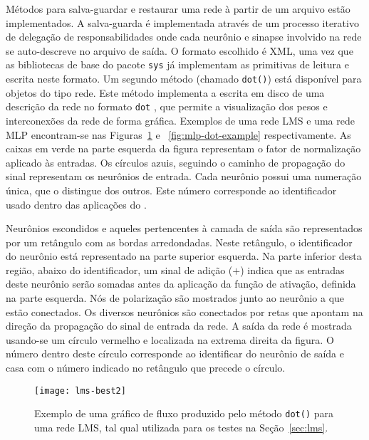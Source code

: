 Métodos para salva-guardar e restaurar uma rede à partir de um arquivo es\-tão
implementados. A salva-guarda é implementada através de um processo iterativo
de delegação de responsabilidades onde cada neurônio e sinapse involvido na
rede se auto-descreve no arquivo de saída. O formato escolhido é XML, uma vez
que as bibliotecas de base do pacote \texttt{sys} já implementam as primitivas
de leitura e escrita neste formato. Um segundo método (chamado \texttt{dot()})
está disponível para objetos do tipo rede. Este método implementa a
escrita em disco de uma descrição da rede no formato \texttt{dot}
\cite{graphviz}, que permite a visualização dos pesos e interconexões da rede
de forma gráfica. Exemplos de uma rede LMS e uma rede MLP encontram-se nas
Figuras~\ref{fig:lms-dot-example} e ~\ref{fig:mlp-dot-example}
respectivamente. As caixas em verde na parte esquerda da figura representam o
fator de normalização aplicado às entradas. Os círculos azuis, seguindo o
caminho de propagação do sinal representam os neurônios de entrada. Cada
neurônio possui uma numeração única, que o distingue dos outros. Este número
corresponde ao identificador usado dentro das aplicações do
. 

Neurônios escondidos e aqueles pertencentes à camada de saída são
representados por um retângulo com as bordas arredondadas. Neste retângulo, o
identificador do neurônio está representado na parte superior esquerda. Na
parte inferior desta região, abaixo do identificador, um sinal de adição ($+$)
indica que as entradas deste neurônio serão somadas antes da aplicação da
função de ativação, definida na parte esquerda. Nós de polarização são
mostrados junto ao neurônio a que estão conectados. Os diversos neurônios são
conectados por retas que apontam na direção da propagação do sinal de entrada
da rede. A saída da rede é mostrada usando-se um círculo vermelho e localizada
na extrema direita da figura. O número dentro deste círculo corresponde ao
identificar do neurônio de saída e casa com o número indicado no retângulo que
precede o círculo.

\begin{figure}
\begin{center}
\texttt{[image: lms-best2]}
\end{center}
\caption{Exemplo de uma gráfico de fluxo produzido pelo método \texttt{dot()}
para uma rede LMS, tal qual utilizada para os testes na Seção~\ref{sec:lms}.}
\label{fig:lms-dot-example}
\end{figure}

